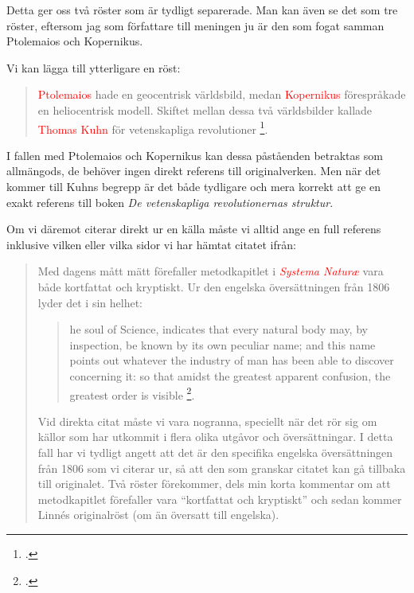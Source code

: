 \documentclass[11pt,a5paper,footinclude=true,headinclude=true]{scrbook} %
\begin{document}
{\noindent Detta ger oss två röster som är tydligt separerade. Man kan även se det som tre röster, eftersom jag som författare till meningen ju är den som fogat samman Ptolemaios och Kopernikus. 

Vi kan lägga till ytterligare en röst:

\begin{quote}
\textcolor{red}{Ptolemaios} hade en geocentrisk världsbild, medan \textcolor{red}{Kopernikus} förespråkade en heliocentrisk modell. Skiftet mellan dessa två världsbilder kallade \textcolor{red}{Thomas Kuhn} för vetenskapliga revolutioner \footcite{kuhnVetenskapligaRevolutionernasStruktur1979}.
\end{quote}

\noindent I fallen med Ptolemaios och Kopernikus kan dessa påståenden betraktas som allmängods, de behöver ingen direkt referens till originalverken. Men när det kommer till Kuhns begrepp är det både tydligare och mera korrekt att ge en exakt referens till boken \emph{De vetenskapliga revolutionernas struktur}.

Om vi däremot citerar direkt ur en källa måste vi alltid ange en full referens inklusive vilken eller vilka sidor vi har hämtat citatet ifrån:

\begin{quote}
Med dagens mått mätt förefaller metodkapitlet i \textcolor{red}{\emph{Systema Naturæ}} vara både kortfattat och kryptiskt. Ur den engelska översättningen från 1806 lyder det i sin helhet:

\begin{quote}
\begin{footnotesize}
[T]he soul of Science, indicates that every natural body may, by inspection, be known by its own peculiar name; and this name points out whatever the industry of man has been able to discover concerning it: so that amidst the greatest apparent confusion, the greatest order is visible \footcite[s. 3]{linneGeneralSystemNature1806}.
\end{footnotesize}
\end{quote}

\noindent Vid direkta citat måste vi vara nogranna, speciellt när det rör sig om källor som har utkommit i flera olika utgåvor och översättningar. I detta fall har vi tydligt angett att det är den specifika engelska översättningen från 1806 som vi citerar ur, så att den som granskar citatet kan gå tillbaka till originalet. Två röster förekommer, dels min korta kommentar om att metodkapitlet förefaller vara ``kortfattat och kryptiskt'' och sedan kommer Linnés originalröst (om än översatt till engelska).



\end{quote}}
\end{document}
